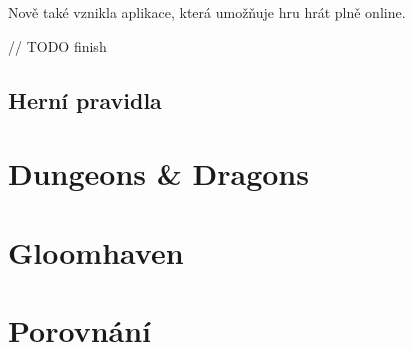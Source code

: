 Nově také vznikla aplikace, která umožňuje hru hrát plně online.

// TODO finish

\subsection{Herní pravidla}
\label{subsec:fw_rules}



\section{Dungeons \& Dragons}
\label{sec:dnd}


\section{Gloomhaven}
\label{sec:gloomhaven}



\section{Porovnání}
\label{sec:comparison}